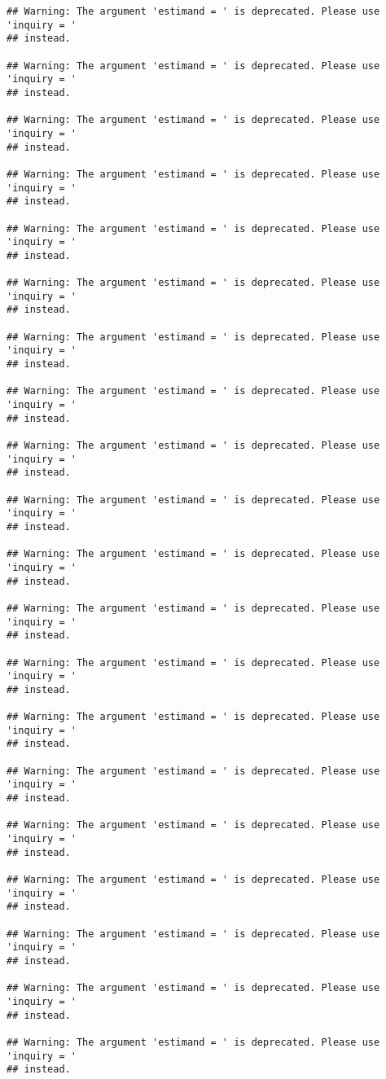 \documentclass[
]{book}
\begin{document}
\begin{verbatim}
## Warning: The argument 'estimand = ' is deprecated. Please use 'inquiry = '
## instead.

## Warning: The argument 'estimand = ' is deprecated. Please use 'inquiry = '
## instead.

## Warning: The argument 'estimand = ' is deprecated. Please use 'inquiry = '
## instead.

## Warning: The argument 'estimand = ' is deprecated. Please use 'inquiry = '
## instead.

## Warning: The argument 'estimand = ' is deprecated. Please use 'inquiry = '
## instead.

## Warning: The argument 'estimand = ' is deprecated. Please use 'inquiry = '
## instead.

## Warning: The argument 'estimand = ' is deprecated. Please use 'inquiry = '
## instead.

## Warning: The argument 'estimand = ' is deprecated. Please use 'inquiry = '
## instead.

## Warning: The argument 'estimand = ' is deprecated. Please use 'inquiry = '
## instead.

## Warning: The argument 'estimand = ' is deprecated. Please use 'inquiry = '
## instead.

## Warning: The argument 'estimand = ' is deprecated. Please use 'inquiry = '
## instead.

## Warning: The argument 'estimand = ' is deprecated. Please use 'inquiry = '
## instead.

## Warning: The argument 'estimand = ' is deprecated. Please use 'inquiry = '
## instead.

## Warning: The argument 'estimand = ' is deprecated. Please use 'inquiry = '
## instead.

## Warning: The argument 'estimand = ' is deprecated. Please use 'inquiry = '
## instead.

## Warning: The argument 'estimand = ' is deprecated. Please use 'inquiry = '
## instead.

## Warning: The argument 'estimand = ' is deprecated. Please use 'inquiry = '
## instead.

## Warning: The argument 'estimand = ' is deprecated. Please use 'inquiry = '
## instead.

## Warning: The argument 'estimand = ' is deprecated. Please use 'inquiry = '
## instead.

## Warning: The argument 'estimand = ' is deprecated. Please use 'inquiry = '
## instead.
\end{verbatim}
\end{document}
